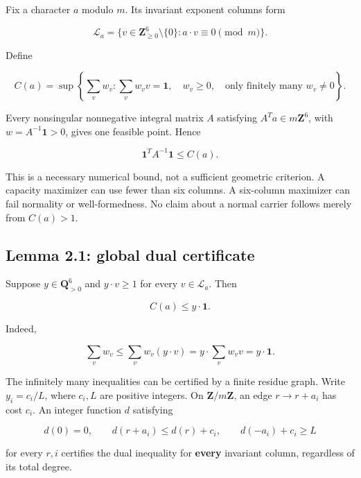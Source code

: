 Fix a character \(a\) modulo \(m\). Its invariant exponent columns form

\[
\mathcal L_a=\{v\in\mathbf Z_{\ge0}^6\setminus\{0\}:a\cdot v\equiv0\pmod m\}.
\]

Define

\begin{equation}\label{eq:capacity_cycles-2.1}
C(a)=\sup\left\{\sum_vw_v:
\sum_vw_vv=\mathbf1,\quad w_v\ge0,
\quad\text{only finitely many }w_v\ne0\right\}.\end{equation}

Every nonsingular nonnegative integral matrix \(A\) satisfying
\(A^Ta\in m\mathbf Z^6\), with \(w=A^{-1}\mathbf1>0\), gives one
feasible point. Hence

\begin{equation}\label{eq:capacity_cycles-2.2}
\mathbf1^TA^{-1}\mathbf1\le C(a).\end{equation}

This is a necessary numerical bound, not a sufficient geometric
criterion. A capacity maximizer can use fewer than six columns. A
six-column maximizer can fail normality or well-formedness. No claim
about a normal carrier follows merely from \(C(a)>1\).

\hypertarget{capacity_cycles-lemma-2.1-global-dual-certificate}{%
\subsection{Lemma 2.1: global dual
certificate}\label{capacity_cycles-lemma-2.1-global-dual-certificate}}

Suppose \(y\in\mathbf Q_{>0}^6\) and \(y\cdot v\ge1\) for every
\(v\in\mathcal L_a\). Then

\[
C(a)\le y\cdot\mathbf1.
\]

Indeed,

\[
\sum_vw_v\le\sum_vw_v(y\cdot v)
=y\cdot\sum_vw_vv=y\cdot\mathbf1.
\]

The infinitely many inequalities can be certified by a finite residue
graph. Write \(y_i=c_i/L\), where \(c_i,L\) are positive integers. On
\(\mathbf Z/m\mathbf Z\), an edge \(r\to r+a_i\) has cost \(c_i\). An
integer function \(d\) satisfying

\begin{equation}\label{eq:capacity_cycles-2.3}
d(0)=0,\qquad d(r+a_i)\le d(r)+c_i,
\qquad d(-a_i)+c_i\ge L\end{equation}

for every \(r,i\) certifies the dual inequality for \textbf{every}
invariant column, regardless of its total degree.

